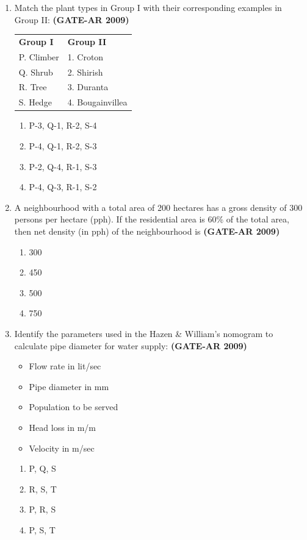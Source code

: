 \documentclass[a4paper,10pt]{article}
\begin{document}
\begin{enumerate}
	\item Match the plant types in Group I with their corresponding examples in Group II: \hfill \textbf{(GATE-AR 2009)} \\
    \begin{tabular}{ l l }
	\textbf{Group I} & \textbf{Group II} \\
	P. Climber & 1. Croton \\
	Q. Shrub & 2. Shirish \\
	R. Tree & 3. Duranta \\
	S. Hedge & 4. Bougainvillea \\
	\end{tabular}
	\begin{multicols}{2}
	\begin{enumerate}
        \item P-3, Q-1, R-2, S-4
        \item P-4, Q-1, R-2, S-3
        \item P-2, Q-4, R-1, S-3
        \item P-4, Q-3, R-1, S-2
    \end{enumerate}
	\end{multicols}

    \item A neighbourhood with a total area of 200 hectares has a gross density of 300 persons per hectare (pph). If the residential area is 60\% of the total area, then net density (in pph) of the neighbourhood is \hfill \textbf{(GATE-AR 2009)}
    \begin{multicols}{4}
	\begin{enumerate}
        \item 300
        \item 450
        \item 500
        \item 750
    \end{enumerate}
	\end{multicols}

    \item Identify the parameters used in the Hazen \& William’s nomogram to calculate pipe diameter for water supply: \hfill \textbf{(GATE-AR 2009)}
    \begin{itemize}
        \item Flow rate in lit/sec
        \item Pipe diameter in mm
        \item Population to be served
        \item Head loss in m/m
        \item Velocity in m/sec
    \end{itemize}
    \begin{multicols}{4}
	\begin{enumerate}
        \item P, Q, S
        \item R, S, T
        \item P, R, S
        \item P, S, T
    \end{enumerate}
	\end{multicols}


\end{enumerate}
\end{document}
